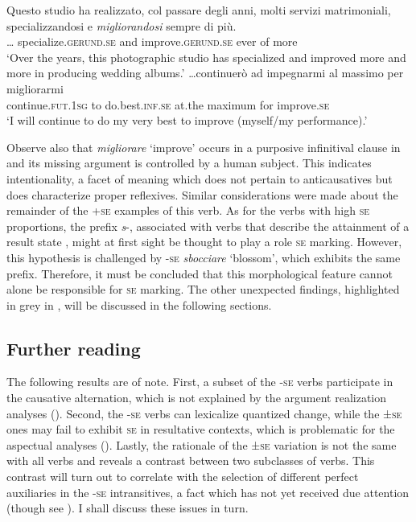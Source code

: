 \documentclass[output=paper,colorlinks,citecolor=brown
]{langscibook}
\begin{document}
\ea \label{bentley_example_7} \ea \label{bentley_example_7a} \gll Questo studio ha realizzato, col passare degli anni, molti servizi matrimoniali, specializzandosi e \textit{migliorandosi} sempre di	più. \\
    {\ldots} specialize.\textsc{gerund}.\textsc{se} and improve.\textsc{gerund}.\textsc{se} ever of more\\
    \glt ‘Over the years, this photographic studio has specialized and improved more and more in producing wedding albums.’
    \ex \label{bentley_example_7b}
    \gll  \ldots  continuerò ad impegnarmi al massimo per migliorarmi \\
    continue.\textsc{fut}.1\textsc{sg}	to do.best.\textsc{inf}.\textsc{se} at.the maximum for improve.\textsc{se} \\
    \glt ‘I will continue to do my very best to improve (myself/my performance).’
    \z
\z

Observe also that \textit{migliorare} ‘improve’ occurs in a purposive infinitival clause in  and its missing argument is controlled by a human subject. This indicates intentionality, a facet of meaning which does not pertain to anticausatives but does characterize proper reflexives. Similar considerations were made about the remainder of the +\textsc{se} examples of this verb. 
As for the verbs with high \textsc{se} proportions, the prefix \textit{s}-, associated with verbs that describe the attainment of a result state \citep[112, 146, 159]{iacobini2004prefissazione}, might at first sight be thought to play a role \textsc{se} marking. However, this hypothesis is challenged by -\textsc{se} \textit{sbocciare} ‘blossom’, which exhibits the same prefix. Therefore, it must be concluded that this morphological feature cannot alone be responsible for \textsc{se} marking. The other unexpected findings, highlighted in grey in , will be discussed in the following sections.  

\subsection{Further reading}
\label{bentley_section_3.3}
The following results are of note. First, a subset of the -\textsc{se} verbs participate in the causative alternation, which is not explained by the argument realization analyses (). Second, the -\textsc{se} verbs can lexicalize quantized change, while the ±\textsc{se} ones may fail to exhibit \textsc{se} in resultative contexts, which is problematic for the aspectual analyses (). Lastly, the rationale of the ±\textsc{se} variation is not the same with all verbs and reveals a contrast between two subclasses of verbs. 
This contrast will turn out to correlate with the selection of different perfect auxiliaries in the -\textsc{se} intransitives, a fact which has not yet received due attention (though see \cite{bentley2021two}). I shall discuss these issues in turn.
\end{document}
